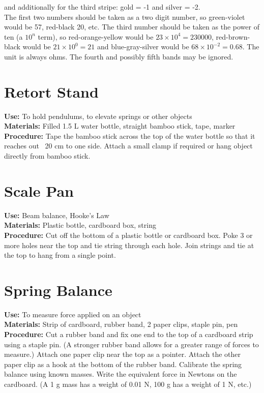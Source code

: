 and additionally for the third stripe: gold = -1 and silver = -2. \\

\noindent The first two numbers should be taken as a two digit number, so green-violet would be 57, red-black 20, etc. The third number should be taken as the power of ten (a $ 10^{n} $ term), so red-orange-yellow would be $ 23 \times 10^{4} = 230000 $, red-brown-black would be $ 21 \times 10^{0} = 21 $ and blue-gray-silver would be $ 68 \times 10^{-2} = 0.68 $. The unit is always ohms. The fourth and possibly fifth bands may be ignored.

\section{Retort Stand}
\vspace{-10pt}
\textbf{Use:} To hold pendulums, to elevate springs or other objects\\
\textbf{Materials:} Filled 1.5 L water bottle, straight bamboo stick, tape, marker\\
\textbf{Procedure:} Tape the bamboo stick across the top of the water bottle so that it reaches out ~20 cm to one side. Attach a small clamp if required or hang object directly from bamboo stick.

\section{Scale Pan}
\vspace{-10pt}
\textbf{Use:} Beam balance, Hooke's Law\\
\textbf{Materials:} Plastic bottle, cardboard box, string\\
\textbf{Procedure:} Cut off the bottom of a plastic bottle or cardboard box. Poke 3 or more holes near the top and tie string through each hole. Join strings and tie at the top to hang from a single point.

\section{Spring Balance}
\textbf{Use:} To measure force applied on an object\\
\textbf{Materials:} Strip of cardboard, rubber band, 2 paper clips, staple pin, pen\\
\textbf{Procedure:} Cut a rubber band and fix one end to the top of a cardboard strip using a staple pin. (A stronger rubber band allows for a greater range of forces to measure.) Attach one paper clip near the top as a pointer. Attach the other paper clip as a hook at the bottom of the rubber band. Calibrate the spring balance using known masses. Write the equivalent force in Newtons on the cardboard. (A 1 g mass has a weight of 0.01 N, 100 g has a weight of 1 N, etc.)

